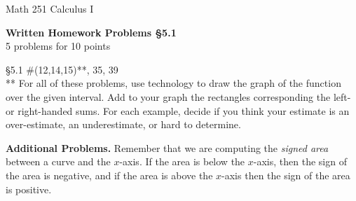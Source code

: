 \documentclass[11pt]{report}
\theoremstyle{plain}
\begin{document}
\hfill Math 251 Calculus I
\begin{center}
\Large{\textbf{Written Homework Problems \S 5.1}} \\
5 problems for 10 points\\
\end{center}

\begin{description}
\item{\S 5.1} \#(12,14,15)**, 35, 39\\

** For all of these problems, use technology to draw the graph of the function over the given interval. Add to your graph the rectangles corresponding the left- or right-handed sums. For each example, decide if you think your estimate is an over-estimate, an underestimate, or hard to determine.
\end{description}

{\bf Additional Problems.} Remember that we are computing the \emph{signed area} between a curve and the $x$-axis. If the area is below the $x$-axis, then the sign of the area is negative, and if the area is above the $x$-axis then the sign of the area is positive.
\end{document}
